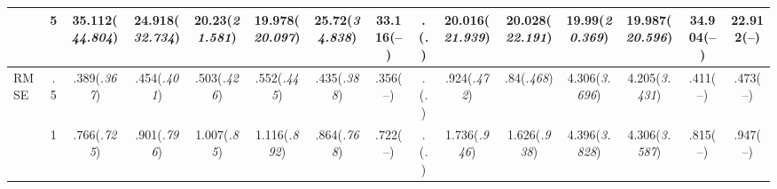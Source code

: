 \documentclass{article}
\begin{document}
\begin{table}[tbp]
{\begin{tabularx}{\textwidth}{lCCCCCCCCCCCCCC}
&5&35.112\newline (\emph{44.804})&24.918\newline (\emph{32.734})&20.23\newline (\emph{21.581})&19.978\newline (\emph{20.097})&25.72\newline (\emph{34.838})&33.116\newline (--)&.\newline (\emph{.})&20.016\newline (\emph{21.939})&20.028\newline (\emph{22.191})&19.99\newline (\emph{20.369})&19.987\newline (\emph{20.596})&34.904\newline (--)&22.912\newline (--) \tabularnewline
\midrule RMSE&.5&.389\newline (\emph{.367})&.454\newline (\emph{.401})&.503\newline (\emph{.426})&.552\newline (\emph{.445})&.435\newline (\emph{.388})&.356\newline (--)&.\newline (\emph{.})&.924\newline (\emph{.472})&.84\newline (\emph{.468})&4.306\newline (\emph{3.696})&4.205\newline (\emph{3.431})&.411\newline (--)&.473\newline (--) \tabularnewline
&1&.766\newline (\emph{.725})&.901\newline (\emph{.796})&1.007\newline (\emph{.85})&1.116\newline (\emph{.892})&.864\newline (\emph{.768})&.722\newline (--)&.\newline (\emph{.})&1.736\newline (\emph{.946})&1.626\newline (\emph{.938})&4.396\newline (\emph{3.828})&4.306\newline (\emph{3.587})&.815\newline (--)&.947\newline (--) \tabularnewline

\end{tabularx}}
\end{table}
\end{document}
